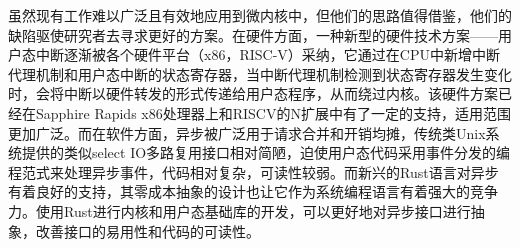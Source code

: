 虽然现有工作难以广泛且有效地应用到微内核中，但他们的思路值得借鉴，他们的缺陷驱使研究者去寻求更好的方案。在硬件方面，一种新型的硬件技术方案——用户态中断\cite{nassif2022sapphire, RISCVPrivileged2020}逐渐被各个硬件平台（x86，RISC-V）采纳，它通过在CPU中新增中断代理机制和用户态中断的状态寄存器，当中断代理机制检测到状态寄存器发生变化时，会将中断以硬件转发的形式传递给用户态程序，从而绕过内核。该硬件方案已经在Sapphire Rapids x86处理器上和RISCV的N扩展中有了一定的支持，适用范围更加广泛。而在软件方面，异步被广泛用于请求合并和开销均摊，传统类Unix系统提供的类似select IO多路复用接口相对简陋，迫使用户态代码采用事件分发的编程范式来处理异步事件，代码相对复杂，可读性较弱。而新兴的Rust\cite{levy2015ownership, balasubramanian2017system}语言对异步有着良好的支持，其零成本抽象的设计也让它作为系统编程语言有着强大的竞争力。使用Rust进行内核和用户态基础库的开发，可以更好地对异步接口进行抽象，改善接口的易用性和代码的可读性。

\begin{table}
    \centering
    \caption{国内外研究现状汇总}
    \label{tab:optimization_methods}
\end{table}

